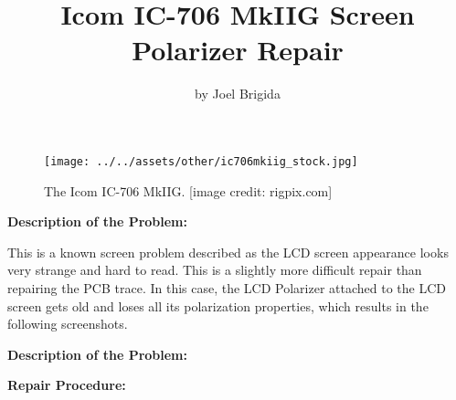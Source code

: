 \documentclass[11pt, letterpaper]{article}
\title{Icom IC-706 MkIIG Screen Polarizer Repair}
\author{by Joel Brigida}
\date{} %
\begin{document}
\maketitle
\thispagestyle{empty} %

\hfill \break
\hfill \break
\hfill \break

\begin{figure}[H] %
    \centering %
    \texttt{[image: ../../assets/other/ic706mkiig\_stock.jpg]} %
    \caption{The Icom IC-706 MkIIG. [image credit: rigpix.com]} %
\end{figure}

\newpage
\setcounter{page}{1} %

\begin{center}
    \textbf{Description of the Problem:}
\end{center}

\hspace{\parindent}This is a known screen problem described as the LCD screen appearance looks very strange and 
hard to read. This is a slightly more difficult repair than repairing the PCB trace. In this case, the LCD Polarizer
attached to the LCD screen gets old and loses all its polarization properties, which results in the following
screenshots.

\newpage
\setcounter{page}{1} %

\begin{center}
    \textbf{Description of the Problem:}
\end{center}

\newpage

\begin{center}
    \textbf{Repair Procedure:}
\end{center}
\end{document}

